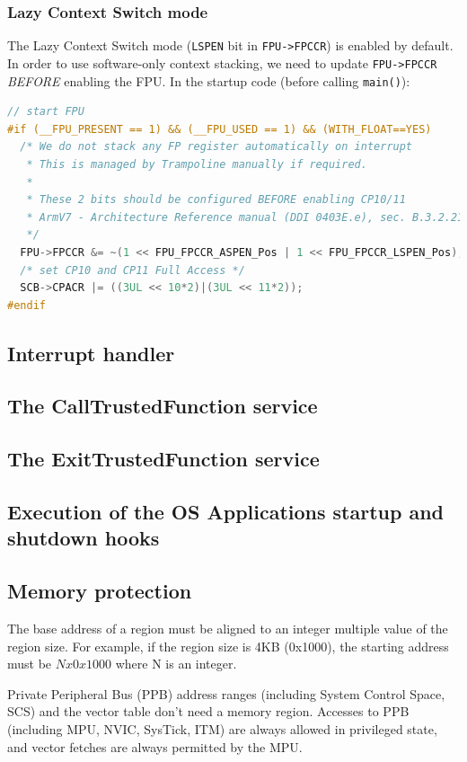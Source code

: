\subsubsection{Lazy Context Switch mode}
The Lazy Context Switch mode (\texttt{LSPEN} bit in \texttt{FPU->FPCCR}) is enabled by default. In order to use software-only context stacking, we need to update  \texttt{FPU->FPCCR} \emph{BEFORE} enabling the FPU. In the startup code (before calling \texttt{main()}):

\begin{lstlisting}[language=C]
// start FPU
#if (__FPU_PRESENT == 1) && (__FPU_USED == 1) && (WITH_FLOAT==YES)
  /* We do not stack any FP register automatically on interrupt    
   * This is managed by Trampoline manually if required.
   *
   * These 2 bits should be configured BEFORE enabling CP10/11
   * ArmV7 - Architecture Reference manual (DDI 0403E.e), sec. B.3.2.21
   */
  FPU->FPCCR &= ~(1 << FPU_FPCCR_ASPEN_Pos | 1 << FPU_FPCCR_LSPEN_Pos);
  /* set CP10 and CP11 Full Access */
  SCB->CPACR |= ((3UL << 10*2)|(3UL << 11*2));
#endif
\end{lstlisting}



\subsection{Interrupt handler}

\subsection{The CallTrustedFunction service}
\subsection{The ExitTrustedFunction service}
\subsection{Execution of the OS Applications startup and shutdown hooks}
\subsection{Memory protection}

The base address of a region must be aligned to an integer multiple value of the region size.
For example, if the region size is 4KB (0x1000), the starting address must be $N x 0x1000$ where N is an integer.

Private Peripheral Bus (PPB) address ranges (including System Control Space, SCS) and the vector table don't need a memory region.
Accesses to PPB (including MPU, NVIC, SysTick, ITM) are always allowed in privileged state, and vector fetches are always permitted by the MPU.

